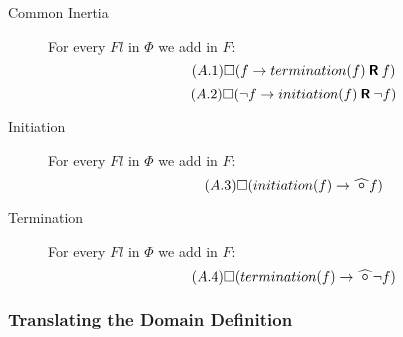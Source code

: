 \begin{description}
  \item[Common Inertia]
  For every $Fl$ in $\Phi$ we add in $F$:
  \begin{equation}\tag{$A.1$}
    \square(f\rightarrow termination(f) \mathbin{\bm{\mathsf{R}}} f)
  \end{equation}
  \begin{equation}\tag{$A.2$}
    \square(\neg f\rightarrow initiation(f) \mathbin{\bm{\mathsf{R}}} \neg f)
  \end{equation}
  \item[Initiation]
  For every $Fl$ in $\Phi$ we add in $F$:
  \begin{equation}\tag{$A.3$}
    \alwaysF(initiation(f)\rightarrow\wnext f)
  \end{equation}
  \item[Termination]
  For every $Fl$ in $\Phi$ we add in $F$:
  \begin{equation}\tag{$A.4$}
    \alwaysF(termination(f)\rightarrow\wnext \neg f)
  \end{equation}
\end{description}

\subsubsection{Translating the Domain Definition}

